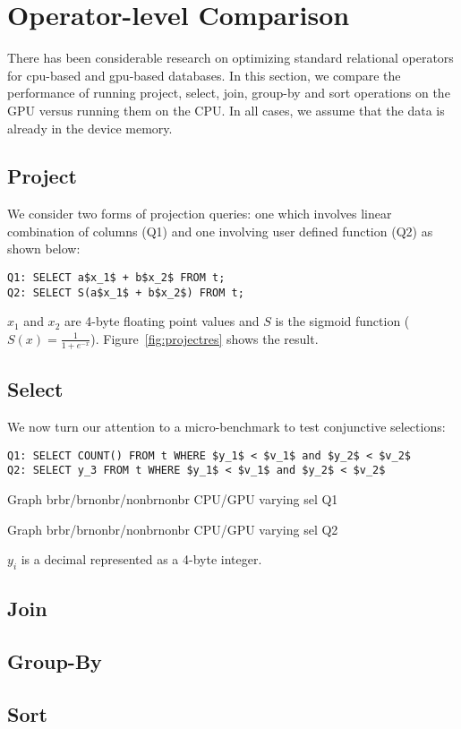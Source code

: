\section{Operator-level Comparison}

There has been considerable research on optimizing standard relational operators
for cpu-based and gpu-based databases. In this section, we compare the 
performance of running project, select, join, group-by and sort operations on the 
GPU versus running them on the CPU. In all cases, we assume that the data is
already in the device memory.

\subsection{Project}

We consider two forms of projection queries: one which involves linear combination 
of columns (Q1) and one involving user defined function (Q2) as shown below:

\begin{lstlisting}
Q1: SELECT a$x_1$ + b$x_2$ FROM t;
Q2: SELECT S(a$x_1$ + b$x_2$) FROM t;
\end{lstlisting}

$x_1$ and $x_2$ are 4-byte floating point values and $S$ is the sigmoid function ($S(x) = \frac{1}{1+e^{-x}}$).
Figure~\ref{fig:projectres} shows the result.

\subsection{Select}

We now turn our attention to a micro-benchmark to test conjunctive selections:

\begin{lstlisting}
Q1: SELECT COUNT() FROM t WHERE $y_1$ < $v_1$ and $y_2$ < $v_2$
Q2: SELECT y_3 FROM t WHERE $y_1$ < $v_1$ and $y_2$ < $v_2$
\end{lstlisting}

Graph brbr/brnonbr/nonbrnonbr CPU/GPU varying sel Q1

Graph brbr/brnonbr/nonbrnonbr CPU/GPU varying sel Q2

$y_i$ is a decimal represented as a 4-byte integer. 

\subsection{Join}



\subsection{Group-By}


\subsection{Sort}

